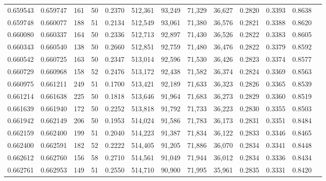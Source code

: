 \begin{tabular}{rrrrrrrrrrrrr}
0.659543 & 0.659747 &   161 &  50 &                                     0.2370 & 512,361 &  93,249 &  71,329 &  36,627 & 0.2820 & 0.3393 & 0.8638 \\
0.659748 & 0.660077 &   188 &  51 &                                     0.2134 & 512,549 &  93,061 &  71,380 &  36,576 & 0.2821 & 0.3388 & 0.8620 \\
0.660080 & 0.660337 &   164 &  50 &                                     0.2336 & 512,713 &  92,897 &  71,430 &  36,526 & 0.2822 & 0.3383 & 0.8605 \\
0.660343 & 0.660540 &   138 &  50 &                                     0.2660 & 512,851 &  92,759 &  71,480 &  36,476 & 0.2822 & 0.3379 & 0.8592 \\
0.660542 & 0.660725 &   163 &  50 &                                     0.2347 & 513,014 &  92,596 &  71,530 &  36,426 & 0.2823 & 0.3374 & 0.8577 \\
0.660729 & 0.660968 &   158 &  52 &                                     0.2476 & 513,172 &  92,438 &  71,582 &  36,374 & 0.2824 & 0.3369 & 0.8563 \\
0.660975 & 0.661211 &   249 &  51 &                                     0.1700 & 513,421 &  92,189 &  71,633 &  36,323 & 0.2826 & 0.3365 & 0.8539 \\
0.661214 & 0.661638 &   225 &  50 &                                     0.1818 & 513,646 &  91,964 &  71,683 &  36,273 & 0.2829 & 0.3360 & 0.8519 \\
0.661639 & 0.661940 &   172 &  50 &                                     0.2252 & 513,818 &  91,792 &  71,733 &  36,223 & 0.2830 & 0.3355 & 0.8503 \\
0.661942 & 0.662149 &   206 &  50 &                                     0.1953 & 514,024 &  91,586 &  71,783 &  36,173 & 0.2831 & 0.3351 & 0.8484 \\
0.662159 & 0.662400 &   199 &  51 &                                     0.2040 & 514,223 &  91,387 &  71,834 &  36,122 & 0.2833 & 0.3346 & 0.8465 \\
0.662400 & 0.662591 &   182 &  52 &                                     0.2222 & 514,405 &  91,205 &  71,886 &  36,070 & 0.2834 & 0.3341 & 0.8448 \\
0.662612 & 0.662760 &   156 &  58 &                                     0.2710 & 514,561 &  91,049 &  71,944 &  36,012 & 0.2834 & 0.3336 & 0.8434 \\
0.662761 & 0.662953 &   149 &  51 &                                     0.2550 & 514,710 &  90,900 &  71,995 &  35,961 & 0.2835 & 0.3331 & 0.8420 \\

\end{tabular}
